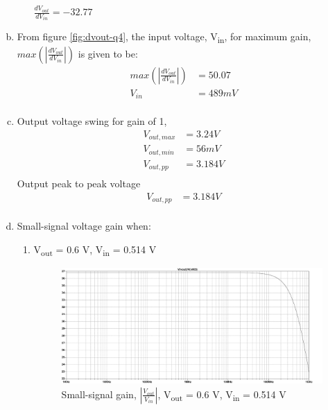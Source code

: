 \documentclass{article}
\begin{document}
\begin{enumerate}[(a)]
\begin{enumerate}[1.]
\(\frac{dV_{out}}{dV_{in}} = -32.77\)
\end{enumerate}
\item From figure \ref{fig:dvout-q4}, the input voltage, V\textsubscript{in}, for maximum gain, \(max(|\frac{dV_{out}}{dV_{in}}|)\) is given to be:
\begin{equation*}
\begin{aligned}
max(|\frac{dV_{out}}{dV_{in}}|) &= 50.07 \\
V_{in} &= 489mV \\
\end{aligned}
\end{equation*}
\item Output voltage swing for gain of 1,
\begin{equation*}
\begin{aligned}
V_{out, max} &= 3.24 V \\
V_{out, min} &= 56 mV \\
V_{out, pp} &= 3.184 V \\
\end{aligned}
\end{equation*}
Output peak to peak voltage
\begin{equation*}
\begin{aligned}
V_{out, pp} &= 3.184 V \\
\end{aligned}
\end{equation*}
\item Small-signal voltage gain when:
\begin{enumerate}[1.]
\item V\textsubscript{out} = 0.6 V, V\textsubscript{in} = 0.514 V
\begin{figure}[H]
\centering
\includegraphics[width=.9\linewidth]{img/q4/e1.pdf}
\caption{\label{fig:gain-q4-e1}Small-signal gain, \(|\frac{V_{out}}{V_{in}}|\), V\textsubscript{out} = 0.6 V, V\textsubscript{in} = 0.514 V}
\end{figure}


\end{enumerate}
\end{enumerate}
\end{document}
